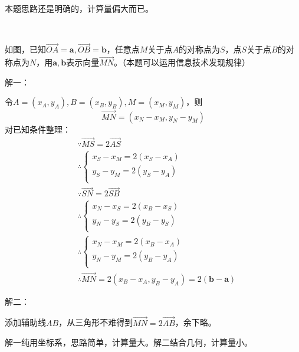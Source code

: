 \begin{tcolorbox}
本题思路还是明确的，计算量偏大而已。
\end{tcolorbox}

~

\begin{example}
如图，已知$\overrightarrow{OA}=\boldsymbol{a},\overrightarrow{OB}=\boldsymbol{b}$，任意点$M$关于点$A$的对称点为$S$，点$S$关于点$B$的对称点为$N$，用$\boldsymbol{a},\boldsymbol{b}$表示向量$\overrightarrow{MN}$。（本题可以运用信息技术发现规律）
\end{example}

\begin{figure}[h]
\centering
{}
\end{figure}

解一：

令$A=\left( x_A,y_A \right) ,B=\left( x_B,y_B \right) ,M=\left( x_M,y_M \right) $，则
\[
\overrightarrow{MN}=\left( x_N-x_M,y_N-y_M \right)
\]
对已知条件整理：
\begin{align*}
&\because \overrightarrow{MS}=2\overrightarrow{AS} \\
&\therefore \begin{cases}
	x_S-x_M=2\left( x_S-x_A \right)\\
	y_S-y_M=2\left( y_S-y_A \right)\\
\end{cases} \\
&\because \overrightarrow{SN}=2\overrightarrow{SB} \\
&\therefore \begin{cases}
	x_N-x_S=2\left( x_B-x_S \right)\\
	y_N-y_S=2\left( y_B-y_S \right)\\
\end{cases} \\
&\therefore \begin{cases}
	x_N-x_M=2\left( x_B-x_A \right)\\
	y_N-y_M=2\left( y_B-y_A \right)\\
\end{cases} \\
&\therefore \overrightarrow{MN}=2\left( x_B-x_A,y_B-y_A \right) =2\left( \boldsymbol{b}-\boldsymbol{a} \right)
\end{align*}

解二：

添加辅助线$AB$，从三角形不难得到$\overrightarrow{MN}=2\overrightarrow{AB}$，余下略。

\begin{tcolorbox}
解一纯用坐标系，思路简单，计算量大。解二结合几何，计算量小。
\end{tcolorbox}




